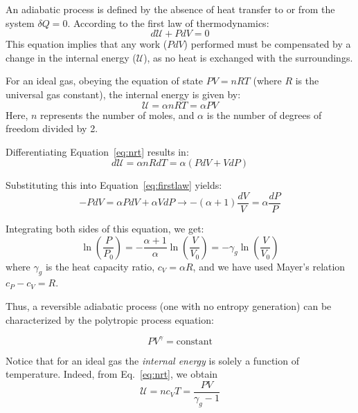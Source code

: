 An adiabatic process is defined by the absence of heat transfer to or from the system \( \delta Q = 0 \). According to the first law of thermodynamics:
\begin{equation}
\label{eq:firstlaw}
d\mathcal U + PdV = 0
\end{equation}
This equation implies that any work (\(PdV\)) performed must be compensated by a change in the internal energy (\(\mathcal U\)), as no heat is exchanged with the surroundings.

For an ideal gas, obeying the equation of state \(PV = nRT\) (where \(R\) is the universal gas constant), the internal energy is given by:
\begin{equation}
\label{eq:nrt} 
\mathcal U = \alpha n R T = \alpha PV 
\end{equation}
Here, \(n\) represents the number of moles, and \( \alpha \) is the number of degrees of freedom divided by 2.

Differentiating Equation~\ref{eq:nrt} results in:
\begin{equation}\label{eq:dunrdt}
d\mathcal U = \alpha n R dT = \alpha (P dV + V dP)
\end{equation}

Substituting this into Equation~\ref{eq:firstlaw} yields:
\begin{equation}
- PdV = \alpha P dV + \alpha V dP \rightarrow -(\alpha + 1) \frac{dV}{V} = \alpha \frac{dP}{P}
\end{equation}

Integrating both sides of this equation, we get:
\begin{equation}
\ln \left( \frac{P}{P_0} \right) = - \frac{\alpha + 1}{\alpha} \ln \left( \frac{V}{V_0} \right) = - \gamma_g \ln \left( \frac{V}{V_0} \right)
\end{equation}
where \( \gamma_g \) is the heat capacity ratio, \( c_V = \alpha R \), and we have used Mayer's relation \(c_P - c_V = R\).

Thus, a reversible adiabatic process (one with no entropy generation) can be characterized by the polytropic process equation:
\begin{remark}
\begin{equation}
PV^\gamma = \text{constant}
\end{equation}
\end{remark}

Notice that for an ideal gas the \emph{internal energy} is solely a function of temperature. Indeed, from Eq.~\ref{eq:nrt}, we obtain 
\begin{equation}
\mathcal U = n c_V T = \frac{PV}{\gamma_g - 1}
\end{equation}

